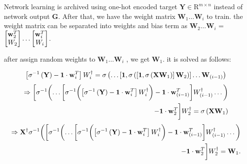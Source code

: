 \documentclass[runningheads]{llncs}
\begin{document}
Network learning is archived using one-hot encoded target $\mathbf{Y}\in{\mathrm{R}}^{m \times n}$ instead of network output $\mathbf{G}$.
After that, we have the weight matrix $\mathbf{W}_{1}\dots\mathbf{W}_{i}$ to train. the weight matrix can be separated into weights and bias term as
$\mathbf{W}_{2}\dots\mathbf{W}_{i}$ = 
$\begin{bmatrix}
\mathbf{w}_{2}^{T}\\\mathnormal{W}_{2}
\end{bmatrix}
\dots
\begin{bmatrix}
\mathbf{w}_{i}^{T}\\\mathnormal{W}_{i}
\end{bmatrix}$.

after assign random weights to $\mathbf{W}_{1}\dots\mathbf{W}_{i}$ , we get $\mathbf{W}_{1}$. it is solved as follows:

\begin{equation*}
    \left[\sigma^{-1}\left(\mathbf{Y}\right)-\mathbf{1}\cdot\mathbf{w}_{i}^{T}\right]\mathnormal{W}_{i}^\dagger = 
    \sigma\left(\dots\left[\mathbf{1},\sigma\left(\left[\mathbf{1},\sigma\left(\mathbf{X}\mathbf{W}_{1}\right)\right]\mathbf{W}_{2}\right)\right]\dots\mathbf{W}_{(i-1)}\right)
\end{equation*}
\begin{equation*}
    \begin{aligned}
        \Rightarrow
        \biggl[\sigma^{-1}\biggl(
        \dots
        \biggl[\sigma^{-1}\biggl(
            \left[\sigma^{-1}\left(\mathbf{Y}\right)-\mathbf{1}\cdot\mathbf{w}_{i}^{T}\right]\mathnormal{W}_{i}^\dagger
        \biggr)
        - \mathbf{1}\cdot\mathbf{w}_{(i-1)}^{T}\biggr]\mathnormal{W}_{(i-1)}^{\dagger}
        \dots\biggr)\\
        - \mathbf{1}\cdot\mathbf{w}_{2}^{T}\biggr]\mathnormal{W}_{2}^{\dagger} 
        = \sigma\left(\mathbf{X}\mathbf{W}_{1}\right)
    \end{aligned}
\end{equation*}
\begin{equation}
    \begin{aligned}
        \Rightarrow
        \mathbf{X}^{\dagger}\sigma^{-1}\biggl(
        \biggl[\sigma^{-1}\biggl(
        \dots
        \biggl[\sigma^{-1}\biggl(
            \left[\sigma^{-1}\left(\mathbf{Y}\right)-\mathbf{1}\cdot\mathbf{w}_{i}^{T}\right]\mathnormal{W}_{i}^\dagger
        \biggr)
        - \mathbf{1}\cdot\mathbf{w}_{(i-1)}^{T}\biggr]\mathnormal{W}_{(i-1)}^{\dagger}
        \dots\biggr)\\
        - \mathbf{1}\cdot\mathbf{w}_{2}^{T}\biggr]\mathnormal{W}_{2}^{\dagger}
        = \mathbf{W}_{1} .
    \end{aligned}
\end{equation}
\end{document}
